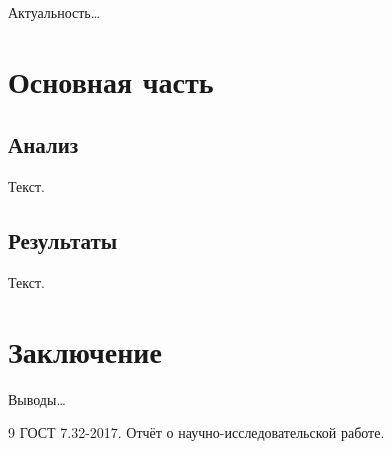 \documentclass[12pt, a4paper]{article}
\begin{document}
Актуальность\ldots

\newpage
\section{Основная часть}

\subsection{Анализ}
Текст.

\subsection{Результаты}
Текст.

\newpage
\section*{Заключение}

Выводы\ldots

\newpage
\begin{thebibliography}{9}
   ГОСТ 7.32-2017. Отчёт о научно-исследовательской работе.
\end{thebibliography}
\end{document}
